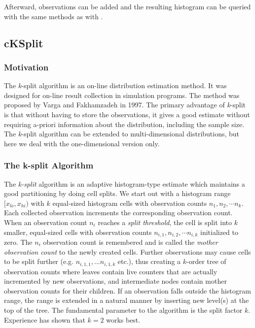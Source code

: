 Afterward, observations can be added and the resulting histogram
can be queried with the same  methods
as with .


\subsection{cKSplit}
\label{sec:sim-lib:ksplit}

\subsubsection{Motivation}
\label{sec:sim-lib:ksplit-purpose}

The \textit{k}-split algorithm is an on-line distribution
estimation method.  It was
designed for on-line result collection in simulation programs.  The
method was proposed by Varga and Fakhamzadeh in 1997. The primary
advantage of \textit{k}-split is that without having to store the
observations, it gives a good estimate without requiring a-priori
information about the distribution, including the sample size. The
\textit{k}-split algorithm can be extended to multi-dimensional
distributions, but here we deal
with the one-dimensional version only.


\subsubsection{The k-split Algorithm}
\label{sec:sim-lib:ksplit-algorithm}

The \textit{k-split} algorithm is an adaptive histogram-type estimate which
maintains a good partitioning by doing cell splits. We start out with
a histogram range $[x_{lo}, x_{hi})$ with $k$ equal-sized histogram
cells with observation counts $n_1,n_2, \cdots n_k$.  Each collected
observation increments the corresponding observation count. When an
observation count $n_i$ reaches a \textit{split threshold}, the cell
is split into $k$ smaller, equal-sized cells with observation counts
$n_{i,1}, n_{i,2}, \cdots n_{i,k}$ initialized to zero. The $n_i$
observation count is remembered and is called the \textit{mother
  observation count} to the newly created cells. Further observations
may cause cells to be split further (e.g. $n_{i,1,1},...n_{i,1,k}$
etc.), thus creating a $k$-order tree of observation counts where
leaves contain live counters that are actually incremented by new
observations, and intermediate nodes contain mother observation counts
for their children. If an observation falls outside the histogram
range, the range is extended in a natural manner by inserting new
level(s) at the top of the tree. The fundamental parameter to the
algorithm is the split factor $k$. Experience has shown that $k=2$
works best.

